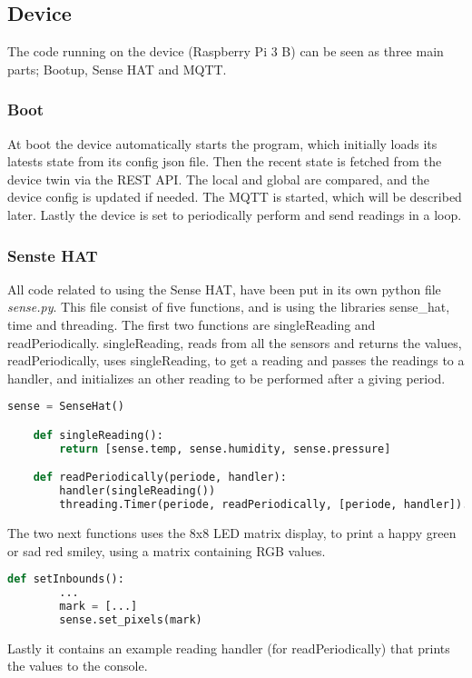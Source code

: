 \subsection{Device}
The code running on the device (Raspberry Pi 3 B) can be seen as three main parts; Bootup, Sense HAT and MQTT.

\subsubsection*{Boot}
At boot the device automatically starts the program, which initially loads its latests state from its config json file. Then the recent state is fetched from the device twin via the REST API. The local and global are compared, and the device config is updated if needed. The MQTT is started, which will be described later. Lastly the device is set to periodically perform and send readings in a loop. 

\subsubsection*{Senste HAT}
All code related to using the Sense HAT, have been put in its own python file \textit{sense.py}. This file consist of five functions, and is using the libraries sense\_hat, time and threading.
The first two functions are singleReading and readPeriodically. singleReading, reads from all the sensors and returns the values, readPeriodically, uses singleReading, to get a reading and passes the readings to a handler, and initializes an other reading to be performed after a giving period.
\begin{lstlisting}[language=Python, caption=Python reading from sensehat, label={lst:rprfsh}, basicstyle=\scriptsize]
    sense = SenseHat()

    def singleReading():
        return [sense.temp, sense.humidity, sense.pressure]   

    def readPeriodically(periode, handler): 
        handler(singleReading())
        threading.Timer(periode, readPeriodically, [periode, handler]).start()
\end{lstlisting}
The two next functions uses the 8x8 LED matrix display, to print a happy green or sad red smiley, using a matrix containing RGB values.
\begin{lstlisting}[language=Python, caption=example of setting LED matrix, label={lst:rpslm}, basicstyle=\scriptsize]
    def setInbounds():
        ...
        mark = [...]
        sense.set_pixels(mark)
\end{lstlisting}
Lastly it contains an example reading handler (for readPeriodically) that prints the values to the console.

